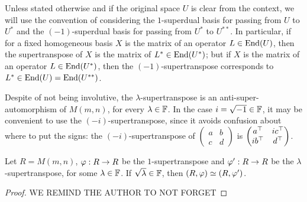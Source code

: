 \documentclass{amsbook}
\begin{document}
\begin{remark}\label{rmk:which-supertranspose-to-use}
    Unless stated otherwise and if the original space $U$ is clear from the context, we will use the convention of considering the $1$-superdual basis for passing from $U$ to $U^*$ and the $(-1)$-superdual basis for passing from $U^*$ to $U^{**}$. In particular, if for a fixed homogeneous basis $X$ is the matrix of an operator $L \in \operatorname{End}(U)$, then the supertranspose of $X$ is the matrix of $L^* \in \operatorname{End}(U^*)$; but if $X$ is the matrix of an operator $L\in \operatorname{End}(U^*)$, then the $(-1)$-supertranspose corresponds to $L^* \in \operatorname{End}(U) = \operatorname{End}(U^{**})$.
\end{remark}

Despite of not being involutive, the $\lambda$-supertranspose is an anti-super-auto\-mor\-phism of $M(m,n)$, for every $\lambda \in \mathbb{F}$. In the case $i = \sqrt{-1}\in \mathbb{F}$, it may be convenient to use the $(-i)$-supertranspose, since it avoids confusion about where to put the signs: the $(-i)$-supertranspose of $\begin{pmatrix}
        a & b\\
        c & d
    \end{pmatrix}$
is $\begin{pmatrix}
        a^{\top} & i c^{\top}\\
        i b^{\top} & d^{\top}
    \end{pmatrix}$.
    
\begin{prop}\label{prop:lambda-supertransp-are-isomorphic}
    Let $R = M(m,n)$, $\varphi: R \to R$ be the $1$-supertranspose and $\varphi': R\to R$ be the $\lambda$-supertranspose, for some $\lambda \in \mathbb{F}$. If $\sqrt{\lambda}\in \mathbb{F}$, then $(R, \varphi) \simeq (R, \varphi')$.
\end{prop}

\begin{proof}
    WE REMIND THE AUTHOR TO NOT FORGET
\end{proof}



\end{document}
